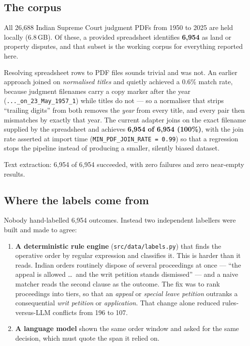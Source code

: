 \documentclass[12pt,a4paper]{article}
\newcommand{\code}[1]{\texttt{\small #1}}
\begin{document}
\subsection{The corpus}

All 26,688 Indian Supreme Court judgment PDFs from 1950 to 2025 are held locally (6.8\,GB). Of
these, a provided spreadsheet identifies \textbf{6,954} as land or property disputes, and that
subset is the working corpus for everything reported here.

Resolving spreadsheet rows to PDF files sounds trivial and was not. An earlier approach joined on
\emph{normalised titles} and quietly achieved a 0.6\% match rate, because judgment filenames carry
a copy marker after the year (\code{...\_on\_23\_May\_1957\_1}) while titles do not --- so a normaliser
that strips ``trailing digits'' from both removes the \emph{year} from every title, and every pair
then mismatches by exactly that year. The current adapter joins on the exact filename supplied by
the spreadsheet and achieves \textbf{6,954 of 6,954 (100\%)}, with the join rate asserted at
import time (\code{MIN\_PDF\_JOIN\_RATE = 0.99}) so that a regression stops the pipeline instead of
producing a smaller, silently biased dataset.

Text extraction: 6,954 of 6,954 succeeded, with zero failures and zero near-empty results.

\subsection{Where the labels come from}

Nobody hand-labelled 6,954 outcomes. Instead two independent labellers were built and made to
agree:

\begin{enumerate}
\item \textbf{A deterministic rule engine} (\code{src/data/labels.py}) that finds the operative
order by regular expression and classifies it. This is harder than it reads. Indian orders routinely
dispose of several proceedings at once --- ``the appeal is allowed \ldots\ and the writ petition
stands dismissed'' --- and a naive matcher reads the second clause as the outcome. The fix was to
rank proceedings into tiers, so that an \emph{appeal} or \emph{special leave petition} outranks a
consequential \emph{writ petition} or \emph{application}. That change alone reduced
rules-versus-LLM conflicts from 196 to 107.
\item \textbf{A language model} shown the same order window and asked for the same decision, which
must quote the span it relied on.
\end{enumerate}
\end{document}
